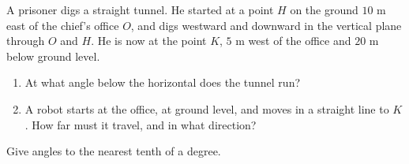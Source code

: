 A prisoner digs a straight tunnel. He started at a point $H$ on the ground $10$ m east of the chief's office $O$, and digs westward and downward in the vertical plane through $O$ and $H$. He is now at the point $K$, $5$ m west of the office and $20$ m below ground level.
\begin{enumerate}
\item[(a)] At what angle below the horizontal does the tunnel run?
\item[(b)] A robot starts at the office, at ground level, and moves in a straight line to $K$. How far must it travel, and in what direction?
\end{enumerate}
Give angles to the nearest tenth of a degree.
